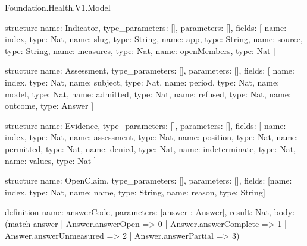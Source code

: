 \begin{lexlean}{Foundation.Health.V1.Model}
\begin{semanticmodule}
structure{
  name: Indicator,
  type_parameters: [],
  parameters: [],
  fields: [
    {name: index, type: Nat},
    {name: slug, type: String},
    {name: app, type: String},
    {name: source, type: String},
    {name: measures, type: Nat},
    {name: openMembers, type: Nat}
  ]
}

structure{
  name: Assessment,
  type_parameters: [],
  parameters: [],
  fields: [
    {name: index, type: Nat},
    {name: subject, type: Nat},
    {name: period, type: Nat},
    {name: model, type: Nat},
    {name: admitted, type: Nat},
    {name: refused, type: Nat},
    {name: outcome, type: Answer}
  ]
}

structure{
  name: Evidence,
  type_parameters: [],
  parameters: [],
  fields: [
    {name: index, type: Nat},
    {name: assessment, type: Nat},
    {name: position, type: Nat},
    {name: permitted, type: Nat},
    {name: denied, type: Nat},
    {name: indeterminate, type: Nat},
    {name: values, type: Nat}
  ]
}

structure{
  name: OpenClaim,
  type_parameters: [],
  parameters: [],
  fields: [{name: index, type: Nat}, {name: name, type: String}, {name: reason, type: String}]
}

definition{
  name: answerCode,
  parameters: [answer : Answer],
  result: Nat,
  body: (match answer
    | Answer.answerOpen => 0
    | Answer.answerComplete => 1
    | Answer.answerUnmeasured => 2
    | Answer.answerPartial => 3)
}


\end{semanticmodule}
\end{lexlean}
